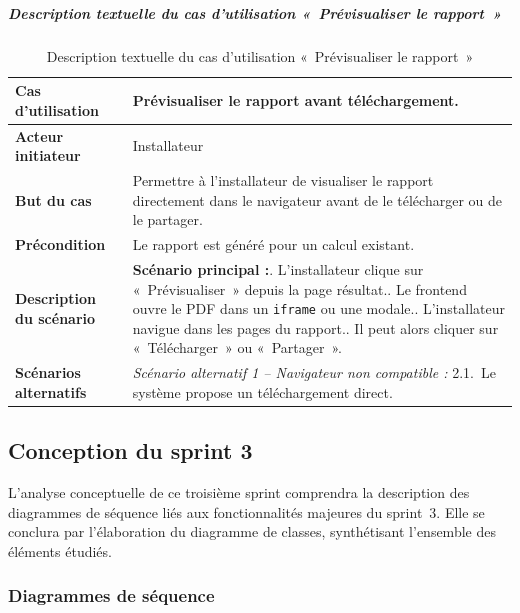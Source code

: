\subparagraph{Description textuelle du cas d'utilisation «~Prévisualiser le rapport~»}

\begin{table}[H]
  \caption{Description textuelle du cas d'utilisation «~Prévisualiser le rapport~»}
  \label{tab:cu-previsualiser-pdf}
  \centering
  \begin{tabularx}{\textwidth}{|L{3.8cm}|X|}
    \hline
    \textbf{Cas d'utilisation} & Prévisualiser le rapport avant téléchargement. \\
    \hline
    \textbf{Acteur initiateur} & Installateur \\
    \hline
    \textbf{But du cas} & Permettre à l'installateur de visualiser le rapport directement dans le navigateur avant de le télécharger ou de le partager. \\
    \hline
    \textbf{Précondition} & Le rapport est généré pour un calcul existant. \\
    \hline
    \textbf{Description du scénario} &
    \textbf{Scénario principal :}. L'installateur clique sur «~Prévisualiser~» depuis la page résultat.. Le frontend ouvre le PDF dans un \texttt{iframe} ou une modale.. L'installateur navigue dans les pages du rapport.. Il peut alors cliquer sur «~Télécharger~» ou «~Partager~».\\
    \hline
    \textbf{Scénarios alternatifs} &
    \textit{Scénario alternatif 1 -- Navigateur non compatible :}\newline
    \hspace*{6pt}2.1.~Le système propose un téléchargement direct.\\
    \hline
  \end{tabularx}
\end{table}

\subsection{Conception du sprint 3}

L'analyse conceptuelle de ce troisième sprint comprendra la description des
diagrammes de séquence liés aux fonctionnalités majeures du sprint~3. Elle
se conclura par l'élaboration du diagramme de classes, synthétisant
l'ensemble des éléments étudiés.

\subsubsection{Diagrammes de séquence}

